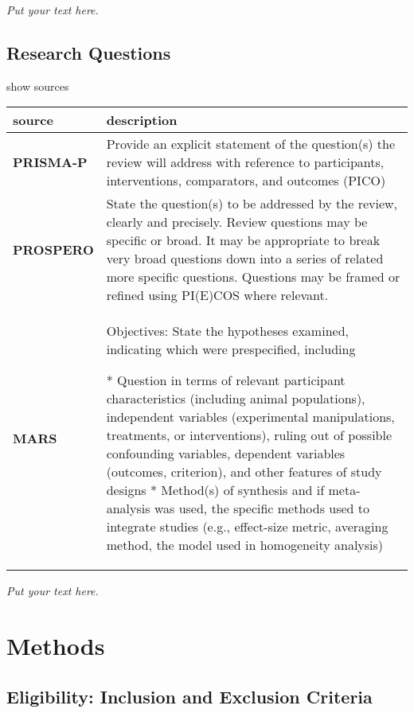 \documentclass[]{article}
\begin{document}
\emph{Put your text here.}

\hypertarget{research-questions}{%
\subsection{Research Questions}\label{research-questions}}

show sources

\hypertarget{rq}{}
\begin{table}[H]
\centering
\begin{tabular}{>{\bfseries}l|l}
\hline
\rowcolor[HTML]{ececec}  source & description\\
\hline
PRISMA-P & Provide an explicit statement of the question(s) the review will address with reference to participants, interventions, comparators, and outcomes (PICO)\\
\hline
PROSPERO & State the question(s) to be addressed by the review, clearly and precisely. Review questions may be specific or broad. It may be appropriate to break very broad questions down into a series of related more specific questions. Questions may be framed or refined using PI(E)COS where relevant.\\
\hline
MARS & Objectives: State the hypotheses examined, indicating which were prespecified, including

* Question in terms of relevant participant characteristics (including animal populations), independent variables (experimental manipulations, treatments, or interventions), ruling out of possible confounding variables, dependent variables (outcomes, criterion), and other features of study designs
* Method(s) of synthesis and if meta-analysis was used, the specific methods used to integrate studies (e.g., effect-size metric, averaging method, the model used in homogeneity analysis)\\
\hline
\end{tabular}
\end{table}

\emph{Put your text here.}

\hypertarget{methods}{%
\section{Methods}\label{methods}}

\hypertarget{eligibility-inclusion-and-exclusion-criteria}{%
\subsection{Eligibility: Inclusion and Exclusion
Criteria}\label{eligibility-inclusion-and-exclusion-criteria}}
\end{document}
